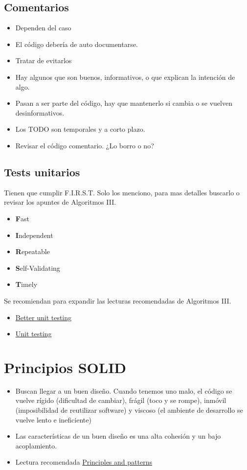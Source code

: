 \subsection*{Comentarios}
\begin{itemize}
\item Dependen del caso
\item El código debería de auto documentarse.
\item Tratar de evitarlos
\item Hay algunos que son buenos, informativos, o que explican la intención de algo.
\item Pasan a ser parte del código, hay que mantenerlo si cambia o  se vuelven desinformativos.
\item Los TODO son temporales y a corto plazo.
\item Revisar el código comentario. ¿Lo borro o no?
\end{itemize}

\subsection*{Tests unitarios}
Tienen que cumplir F.I.R.S.T. Solo los menciono, para mas detalles buscarlo o revisar los apuntes de Algoritmos III.
\begin{itemize}
\item \textbf{F}ast
\item \textbf{I}ndependent
\item \textbf{R}epeatable
\item \textbf{S}elf-Validating
\item \textbf{T}imely
\end{itemize}

Se recomiendan para expandir las lecturas recomendadas de Algoritmos III.
\begin{itemize}
\item \href{https://esj.com/articles/2012/09/24/better-unit-testing.aspx}{Better unit testing}
\item \href{http://fluxens.com/unittesting.html}{Unit testing}
\end{itemize}


\section{Principios SOLID}
\begin{itemize}
\item Buscan llegar a un buen diseño. Cuando tenemos uno malo, el código se vuelve rígido (dificultad de cambiar), frágil (toco y se rompe), inmóvil (imposibilidad de reutilizar software) y viscoso (el ambiente de desarrollo se vuelve lento e ineficiente)
\item Las características de un buen diseño es una alta cohesión y un bajo acoplamiento.
\item Lectura recomendada \href{https://github.com/7510-tecnicas-de-disenio/material-clases/blob/master/Solid/Principles_and_Patterns.pdf}{Principles and patterns}
\end{itemize}

